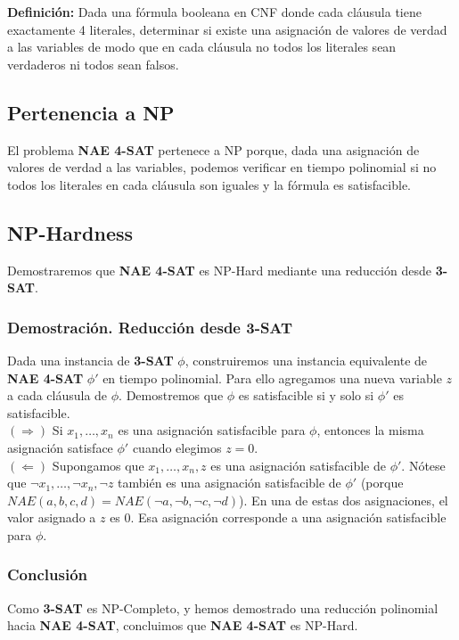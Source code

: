\documentclass[a4paper,12pt]{article}
\begin{document}
\textbf{Definici\'on:} Dada una f\'ormula booleana en CNF donde cada cl\'ausula tiene exactamente 4 literales, determinar si existe una asignaci\'on de valores de verdad a las variables de modo que en cada cl\'ausula no todos los literales sean verdaderos ni todos sean falsos.

\subsection{Pertenencia a NP}
El problema \textbf{NAE 4-SAT} pertenece a NP porque, dada una asignaci\'on de valores de verdad a las variables, podemos verificar en tiempo polinomial si no todos los literales en cada cl\'ausula son iguales y la fórmula es satisfacible.

\subsection{NP-Hardness}

Demostraremos que \textbf{NAE 4-SAT} es NP-Hard mediante una reducci\'on desde \textbf{3-SAT}.

\subsubsection{Demostraci\'on. Reducción desde 3-SAT}
Dada una instancia de \textbf{3-SAT} $\phi$, construiremos una instancia equivalente de \textbf{NAE 4-SAT} $\phi'$ en tiempo polinomial. Para ello agregamos una nueva variable $z$ a cada cl\'ausula de $\phi$.
Demostremos que $\phi$ es satisfacible si y solo si $\phi'$ es satisfacible. \\

$(\Rightarrow)$ Si $x_1, \ldots, x_n$ es una asignación satisfacible para $\phi$, entonces la misma asignación satisface $\phi'$ cuando elegimos $z=0$. \\

$(\Leftarrow)$ Supongamos que $x_1, \ldots, x_n, z$ es una asignación satisfacible de $\phi'$. Nótese que
$\neg{x_1}, \ldots, \neg{x_n}, \neg{z}$ también es una asignación satisfacible de $\phi'$ (porque $NAE(a,b,c,d) = NAE(\neg{a},\neg{b},\neg{c},\neg{d})$).
En una de estas dos asignaciones, el valor asignado a $z$ es 0. Esa asignación corresponde a una asignación satisfacible para $\phi$.\\



\subsubsection{Conclusi\'on}
Como \textbf{3-SAT} es NP-Completo, y hemos demostrado una reducci\'on polinomial hacia \textbf{NAE 4-SAT}, concluimos que \textbf{NAE 4-SAT} es NP-Hard. 
\end{document}
